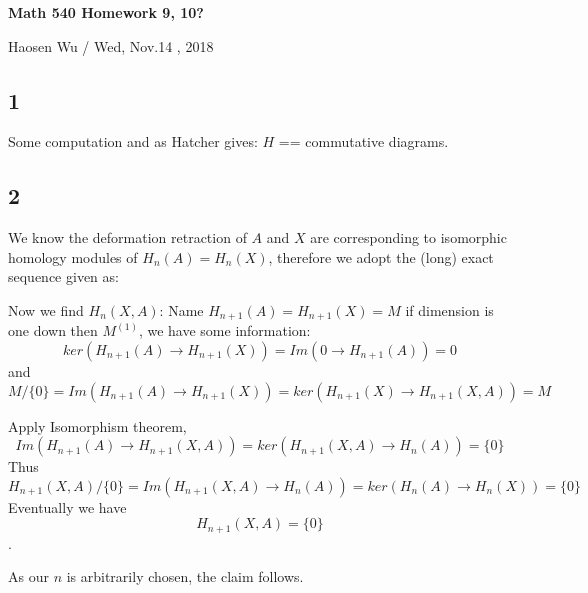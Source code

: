 \documentclass[11pt]{article}
\theoremstyle{remark}
\begin{document}
\begin{center}
    \begin{Large} {\bf Math 540 Homework 9, 10?}\\
    \end{Large}
    Haosen Wu  / Wed, Nov.14 , 2018
\end{center}


\subsection*{1}
Some computation and as Hatcher gives: $H$ == commutative diagrams.
\begin{itemize}
\end{itemize}


\subsection*{2}
We know the deformation retraction of $A$ and $X$ are corresponding to isomorphic homology modules of $H_{n}(A)=H_{n}(X)$, therefore we adopt the (long) exact sequence given as:


Now we find $H_{n}(X,A)$: Name $H_{n+1}(A)=H_{n+1}(X)=M$ if dimension is one down then $M^{(1)}$, we have some information: $$ker(H_{n+1}(A)\rightarrow H_{n+1}(X))=Im(0\rightarrow H_{n+1}(A))=0 $$ and $$M/\{0\}=Im(H_{n+1}(A)\rightarrow H_{n+1}(X))=ker(H_{n+1}(X)\rightarrow H_{n+1}(X,A))=M $$

Apply Isomorphism theorem, $$Im(H_{n+1}(A)\rightarrow H_{n+1}(X,A))=ker(H_{n+1}(X,A)\rightarrow H_{n}(A))=\{0\}$$
Thus $$H_{n+1}(X,A)/\{0\}=Im(H_{n+1}(X,A)\rightarrow H_{n}(A))=ker(H_{n}(A)\rightarrow H_{n}(X))=\{0\}$$
Eventually we have $$H_{n+1}(X,A)=\{0\}$$.

As our $n$ is arbitrarily chosen, the claim follows. 
\end{document}
